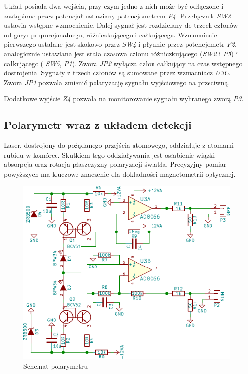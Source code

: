 \documentclass[a4paper,10pt,twoside]{article}
\begin{document}
Układ posiada dwa wejścia, przy czym jedno z nich może być odłączone i zastąpione przez potencjał ustawiany potencjometrem \textit{P4}. Przełącznik \textit{SW3} ustawia wstępne wzmocnienie.
Dalej sygnał jest rozdzielany do trzech członów -- od góry: proporcjonalnego, różniczkującego i całkującego.
Wzmocnienie pierwszego ustalane jest skokowo przez \textit{SW4} i płynnie przez potencjometr \textit{P2}, analogicznie ustawiana jest stała czasowa członu różniczkującego (\textit{SW2} i \textit{P5}) i całkującego ( \textit{SW5}, \textit{P1}). Zwora \textit{JP2} wyłącza człon całkujący na czas wstępnego dostrojenia.
Sygnały z trzech członów są sumowane przez wzmacniacz \textit{U3C}. Zwora \textit{JP1} pozwala zmienić polaryzację sygnału wyjściowego na przeciwną.

Dodatkowe wyjście \textit{Z4} pozwala na monitorowanie sygnału wybranego zworą \textit{P3}.

\subsection{Polarymetr wraz z układem detekcji}

Laser, dostrojony do pożądanego przejścia atomowego, oddziałuje z atomami rubidu w komórce.
Skutkiem tego oddziaływania jest osłabienie wiązki -- absorpcja oraz rotacja płaszczyzny polaryzacji światła.
Precyzyjny pomiar powyższych ma kluczowe znaczenie dla dokładności magnetometrii optycznej.

\begin{figure}
\begin{center}
 \includegraphics{./obrazki/polarymetr.pdf}
\end{center}
\caption{Schemat polarymetru}
\label{sch-mod}
\end{figure}
\end{document}
